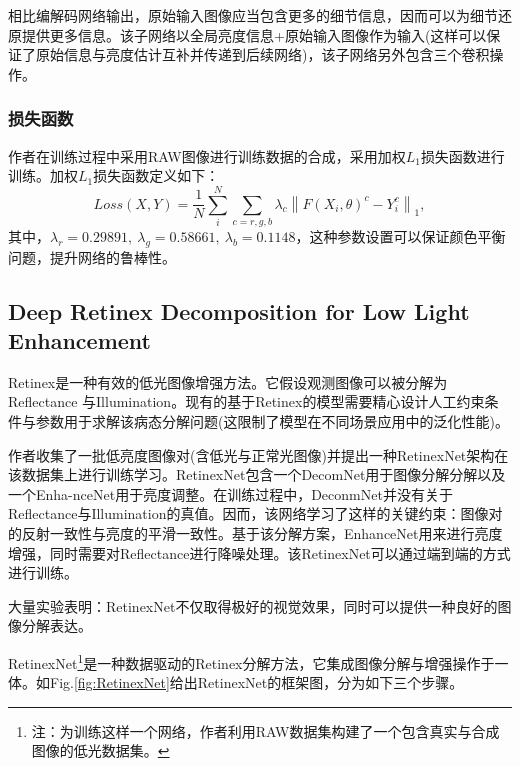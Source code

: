 \documentclass[letterpaper,12pt]{article}
\begin{document}
	相比编解码网络输出，原始输入图像应当包含更多的细节信息，因而可以为细节还原提供更多信息。该子网络以全局亮度信息+原始输入图像作为输入(这样可以保证了原始信息与亮度估计互补并传递到后续网络)，该子网络另外包含三个卷积操作。
	
	\subsubsection{损失函数}
	
	作者在训练过程中采用RAW图像进行训练数据的合成，采用加权$L_1$损失函数进行训练。加权$L_1$损失函数定义如下：
	\begin{equation}\label{eq:L1} %
	Loss\left(X,Y\right)=\frac{1}{N}\sum_{i}^{N}\sum_{c=r,g,b}\lambda_{c}{\left \|F(X_i,\theta)^{c}-Y_{i}^c \right\|}_{1},
	\end{equation}
	其中，$\lambda_r=0.29891,\ \lambda_g=0.58661,\ \lambda_b=0.1148$，这种参数设置可以保证颜色平衡问题，提升网络的鲁棒性。

	
	\subsection{Deep Retinex Decomposition for Low Light Enhancement}

	Retinex是一种有效的低光图像增强方法。它假设观测图像可以被分解为Reflectance
	与Illumination。现有的基于Retinex的模型需要精心设计人工约束条件与参数用于求解该病态分解问题(这限制了模型在不同场景应用中的泛化性能)。
	
	作者收集了一批低亮度图像对(含低光与正常光图像)并提出一种RetinexNet架构在该数据集上进行训练学习。RetinexNet包含一个DecomNet用于图像分解分解以及一个Enha-nceNet用于亮度调整。在训练过程中，DeconmNet并没有关于Reflectance与Illumination的真值。因而，该网络学习了这样的关键约束：图像对的反射一致性与亮度的平滑一致性。基于该分解方案，EnhanceNet用来进行亮度增强，同时需要对Reflectance进行降噪处理。该RetinexNet可以通过端到端的方式进行训练。
	
	大量实验表明：RetinexNet不仅取得极好的视觉效果，同时可以提供一种良好的图像分解表达。
	
	RetinexNet\footnote{注：为训练这样一个网络，作者利用RAW数据集构建了一个包含真实与合成图像的低光数据集。}是一种数据驱动的Retinex分解方法，它集成图像分解与增强操作于一体。如Fig.\ref{fig:RetinexNet}给出RetinexNet的框架图，分为如下三个步骤。
	
\end{document}
